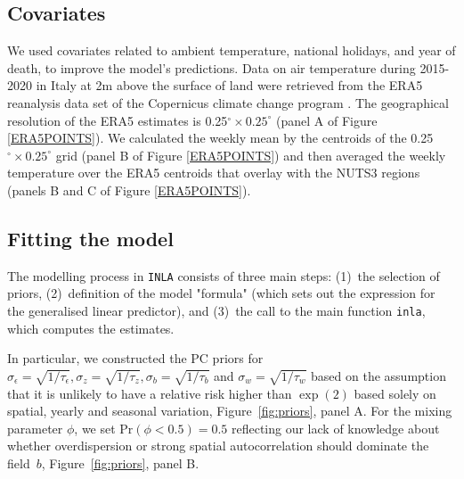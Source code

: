 \subsection{Covariates}
We used covariates related to ambient temperature, national holidays, and year of death, to improve the model's predictions. Data on air temperature during 2015-2020 in Italy at 2m above the surface of land were retrieved from the ERA5 reanalysis data set of the Copernicus climate change program \citep{hersbach2020era5}. The geographical resolution of the ERA5 estimates is 0.25$^\circ\times 0.25^\circ$ (panel A of Figure \ref{ERA5POINTS}). We calculated the weekly mean by the centroids of the 0.25$^\circ\times 0.25^\circ$ grid (panel B of Figure \ref{ERA5POINTS}) and then averaged the weekly temperature over the ERA5 centroids that overlay with the NUTS3 regions (panels B and C of Figure \ref{ERA5POINTS}). 


\subsection{Fitting the model}
The modelling process in \texttt{INLA} consists of three main steps: (1)~the selection of priors, (2)~definition of the model "formula" (which sets out the expression for the generalised linear predictor), and (3)~the call to the main function \texttt{inla}, which computes the estimates. 

In particular, we constructed the PC priors for $\sigma_\epsilon=\sqrt{1/\tau_\epsilon}, \sigma_z=\sqrt{1/\tau_z}, \sigma_b=\sqrt{1/\tau_b}$ and $\sigma_w=\sqrt{1/\tau_w}$ based on the assumption that it is unlikely to have a relative risk higher than $\exp(2)$ based solely on spatial, yearly and seasonal variation, Figure~\ref{fig:priors}, panel A. For the mixing parameter $\phi$, we set $\text{Pr}(\phi<0.5) = 0.5$ reflecting our lack of knowledge about whether overdispersion or strong spatial autocorrelation should dominate the field~$b$, Figure~\ref{fig:priors}, panel B.

